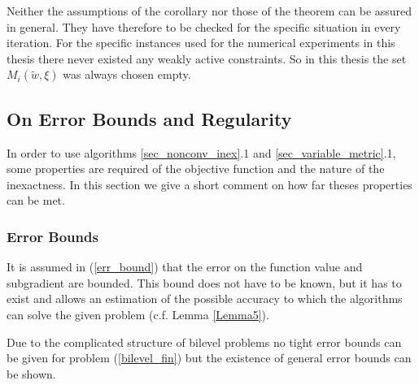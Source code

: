 Neither the assumptions of the corollary nor those of the theorem can be assured in general. They have therefore to be checked for the specific situation in every iteration.
For the specific instances used for the numerical experiments in this thesis there never existed any weakly active constraints. So in this thesis the set \(M_i(\tilde{w},\xi)\) was always chosen empty.







%


\subsection{On Error Bounds and Regularity}

In order to use algorithms \ref{sec_nonconv_inex}.1 and \ref{sec_variable_metric}.1, some properties are required of the objective function and the nature of the inexactness. In this section we give a short comment on how far theses properties can be met.


\subsubsection{Error Bounds}

It is assumed in (\ref{err_bound}) that the error on the function value and subgradient are bounded. This bound does not have to be known, but it has to exist and allows an estimation of the possible accuracy to which the algorithms can solve the given problem (c.f. Lemma \ref{Lemma5}).

Due to the complicated structure of bilevel problems no tight error bounds can be given for problem (\ref{bilevel_fin}) but the existence of general error bounds can be shown.


